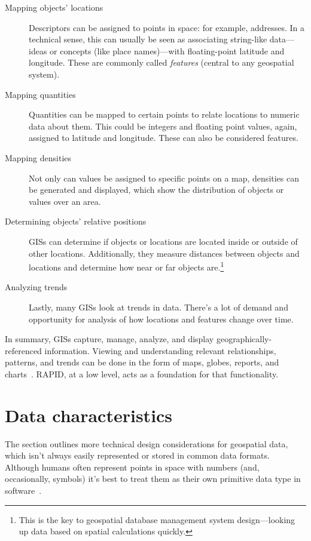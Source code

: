 \begin{description}
  \item[Mapping objects' locations] Descriptors can be assigned to points in space: for example, addresses. In a technical sense, this can usually be seen as associating string-like data---ideas or concepts (like place names)---with floating-point latitude and longitude. These are commonly called \textit{features} (central to any geospatial system).
  \item[Mapping quantities] Quantities can be mapped to certain points to relate locations to numeric data about them. This could be integers and floating point values, again, assigned to latitude and longitude. These can also be considered features.
  \item[Mapping densities] Not only can values be assigned to specific points on a map, densities can be generated and displayed, which show the distribution of objects or values over an area.
  \item[Determining objects' relative positions] GISs can determine if objects or locations are located inside or outside of other locations. Additionally, they measure distances between objects and locations and determine how near or far objects are.\footnote{This is the key to geospatial database management system design---looking up data based on spatial calculations quickly.}
  \item[Analyzing trends] Lastly, many GISs look at trends in data. There's a lot of demand and opportunity for analysis of how locations and features change over time.
\end{description}

In summary, GISs capture, manage, analyze, and display geographically-referenced information. Viewing and understanding relevant relationships, patterns, and trends can be done in the form of maps, globes, reports, and charts~\cite{Esriintro}. RAPID, at a low level, acts as a foundation for that functionality.

\section{Data characteristics}
The section outlines more technical design considerations for geospatial data, which isn't always easily represented or stored in common data formats. Although humans often represent points in space with numbers (and, occasionally, symbols) it's best to treat them as their own primitive data type in software~\cite{gentle_intro}.

